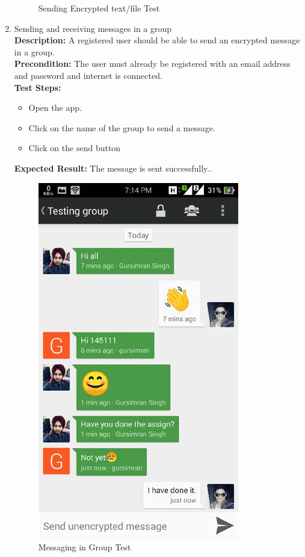 \begin{enumerate}
\begin{figure}[ht]
\caption{Sending Encrypted text/file Test}
\end{figure}
\item Sending and receiving messages in a group\\
\noindent \textbf{Description:}
A registered user should be able to send an encrypted message in a group.\\
\noindent \textbf{Precondition:}
The user must already be registered with an email address and password and internet is
connected.\\
\noindent \textbf{Test Steps:}
\begin{itemize}
\item Open the app.
\item Click on the name of the group to send a message.
\item Click on the send button
\end{itemize}
\noindent \textbf{Expected Result:}
The message is sent successfully..\\
\begin{figure}[ht]
\centering
\includegraphics[scale=0.3]{input/images/s5.png}
\caption{Messaging in Group Test}
\end{figure}
\end{enumerate}
